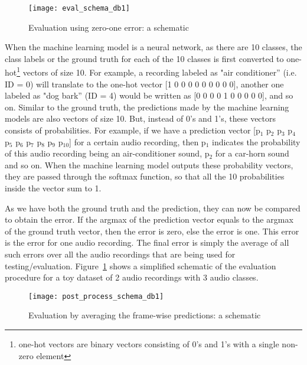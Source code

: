 \begin{figure}[tb] 
\centering 
\texttt{[image: eval\_schema\_db1]} 
\caption[Evaluation Schematic]{Evaluation using zero-one error: a schematic}
\label{fig:eval_schema_db1} 
\end{figure}

When the machine learning model is a neural network, as there are 10 classes, the class labels or the ground truth for each of the 10 classes is first converted to one-hot\footnote{one-hot vectors are binary vectors consisting of 0's and 1's with a single non-zero element} vectors of size 10. For example, a recording labeled as "air conditioner''  (i.e. ID = 0) will translate to the one-hot vector [1 0 0 0 0 0 0 0 0 0], another one labeled as "dog bark'' (ID = 4) would be written as [0 0 0 0 1 0 0 0 0 0], and so on. Similar to the ground truth, the predictions made by the machine learning models are also vectors of size 10. But, instead of 0's and 1's, these vectors consists of probabilities. For example, if we have a prediction vector [p$_{\text{1}}$ p$_{\text{2}}$ p$_{\text{3}}$ p$_{\text{4}}$ p$_{\text{5}}$ p$_{\text{6}}$ p$_{\text{7}}$ p$_{\text{8}}$ p$_{\text{9}}$ p$_{\text{10}}$] for a certain audio recording, then p$_{\text{1}}$ indicates the probability of this audio recording being an air-conditioner sound, p$_{\text{2}}$ for a car-horn sound and so on. When the machine learning model outputs these probability vectors, they are passed through the softmax function, so that all the 10 probabilities inside the vector sum to 1.

As we have both the ground truth and the prediction, they can now be compared to obtain the error. If the argmax of the prediction vector equals to the argmax of the ground truth vector, then the error is zero, else the error is one. This error is the error for one audio recording. The final error is simply the average of all such errors over all the audio recordings that are being used for testing/evaluation. Figure~\ref{fig:eval_schema_db1} shows a simplified schematic of the evaluation procedure for a toy dataset of 2 audio recordings with 3 audio classes.

\begin{figure}[!htb] 
\centering 
\texttt{[image: post\_process\_schema\_db1]} 
\caption[Post processing Schematic]{Evaluation by averaging the frame-wise predictions: a schematic}
\label{fig:post_process_schema_db1} 
\end{figure}

